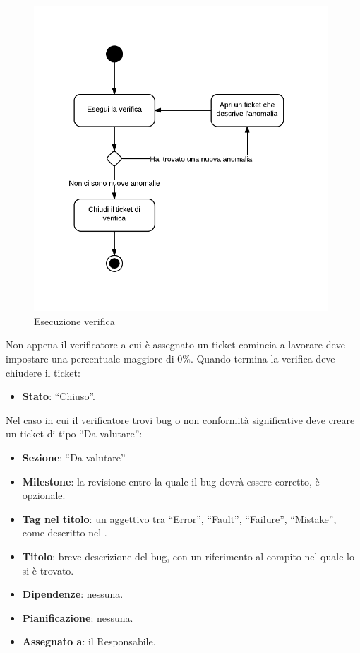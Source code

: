 \begin{figure}[H]
    \centering
    \includegraphics[width=11cm]{uml-processi/Esecuzione_verifica.png}
    \caption{Esecuzione verifica}
\end{figure}

Non appena il verificatore a cui è assegnato un ticket comincia a lavorare deve impostare una percentuale maggiore di $0\%$. Quando termina la verifica deve chiudere il ticket:
\begin{itemize}
 \item \textbf{Stato}: ``Chiuso''.
\end{itemize}

Nel caso in cui il verificatore trovi bug o non conformità significative deve creare un ticket di tipo ``Da valutare'':
\begin{itemize}
 \item \textbf{Sezione}: ``Da valutare''
 \item \textbf{Milestone}: la revisione entro la quale il bug dovrà essere corretto, è opzionale.
 \item \textbf{Tag nel titolo}: un aggettivo tra ``Error'', ``Fault'', ``Failure'', ``Mistake'', come descritto nel \PianoDiQualifica.
 \item \textbf{Titolo}: breve descrizione del bug, con un riferimento al compito nel quale lo si è trovato.
 \item \textbf{Dipendenze}: nessuna.
 \item \textbf{Pianificazione}: nessuna.
 \item \textbf{Assegnato a}: il Responsabile.
\end{itemize}

